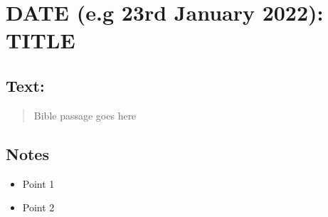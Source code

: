 \section{DATE (e.g 23rd January 2022): TITLE}
\subsection*{Text: }
  \begin{quote}
    Bible passage goes here
  \end{quote}
\subsection*{Notes}
\begin{itemize}
  \item{Point 1}
  \item{Point 2}
\end{itemize}